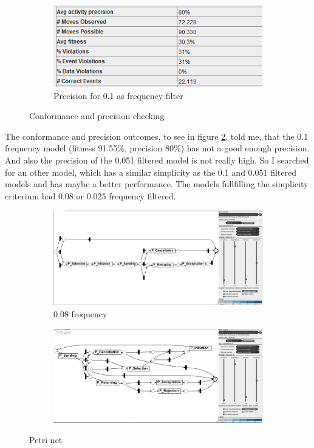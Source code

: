 \begin{figure}[!htbp]
\begin{subfigure}{.4\textwidth}
\end{subfigure}%
\begin{subfigure}{.4\textwidth}
  \centering
  \includegraphics[width=\linewidth]{P_Precision0-1.PNG}
  \caption{Precision for 0.1 as frequency filter}
  \label{fig:P_Prec0-1}
\end{subfigure}
\caption{Conformance and precision checking}
\label{fig:P_ConfPrec}
\end{figure}


The conformance and precision outcomes, to see in figure \ref{fig:P_ConfPrec}, told me, that the 0.1 frequency model (fitness 91.55\%, precision 80\%) has not a good enough precision. And also the precision of the 0.051 filtered model is not really high. So I searched for an other model, which has a similar simplicity as the 0.1 and 0.051 filtered models and has maybe a better performance. The models fullfilling the simplicity criterium had 0.08 or 0.025 frequency filtered.

\begin{figure}[!htbp]
\centering
\begin{subfigure}{0.49\textwidth}
  \centering
  \includegraphics[width=0.8\linewidth]{P_DirectlyFollowedFreq0-08.PNG}
  \caption{0.08 frequency}
  \label{fig:P_0-08}
\end{subfigure}
\begin{subfigure}{0.49\textwidth}
  \centering
  \includegraphics[width=0.8\linewidth]{P_DirectlyFollowedFreq0-025.PNG}
  \label{fig:P_0-025}
\end{subfigure}
\caption{Petri net}
\label{fig:P_Direct2Petri}
\end{figure}



